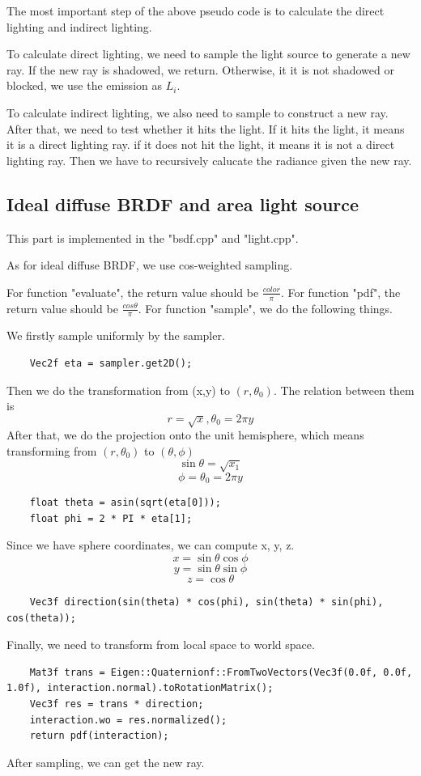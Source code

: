 \documentclass[acmtog]{acmart}
\begin{document}
The most important step of the above pseudo code is to calculate the direct lighting and indirect lighting. 


To calculate direct lighting, we need to sample the light source to generate a new ray. If the new ray is shadowed, we return. Otherwise, it it is not shadowed or blocked, we use the emission as $L_i$.

To calculate indirect lighting, we also need to sample to construct a new ray. 
After that, we need to test whether it hits the light.
If it hits the light, it means it is a direct lighting ray.
if it does not hit the light, it means it is not a direct lighting ray. Then we have to recursively calucate the radiance given the new ray.

\subsection{Ideal diffuse BRDF and area light source}
\quad This part is implemented in the "bsdf.cpp" and "light.cpp".

As for ideal diffuse BRDF, we use cos-weighted sampling. 

For function "evaluate", the return value should be $\frac{color}{\pi}$. For function "pdf", the return value should be $\frac{cos\theta}{\pi}$. 
For function "sample", we do the following things. 

We firstly sample uniformly by the sampler.
\begin{lstlisting}
	Vec2f eta = sampler.get2D();
\end{lstlisting}
Then we do the transformation from (x,y) to $(r,\theta_0)$.
The relation between them is $$r = \sqrt{x}, \theta_0 = 2\pi y $$
After that, we do the projection onto the unit hemisphere, which means transforming from $(r, \theta_0)$ to $(\theta, \phi)$
$$\sin\theta = \sqrt{x_1}$$ $$\phi = \theta_0 = 2\pi y $$
\begin{lstlisting}
	float theta = asin(sqrt(eta[0]));
  	float phi = 2 * PI * eta[1];
\end{lstlisting}
Since we have sphere coordinates, we can compute x, y, z.
$$ x = \sin\theta\cos\phi $$$$ y = \sin\theta\sin\phi $$$$ z = \cos\theta$$
\begin{lstlisting}
	Vec3f direction(sin(theta) * cos(phi), sin(theta) * sin(phi), cos(theta));
\end{lstlisting}
Finally, we need to transform from local space to world space.
\begin{lstlisting}
	Mat3f trans = Eigen::Quaternionf::FromTwoVectors(Vec3f(0.0f, 0.0f, 1.0f), interaction.normal).toRotationMatrix();
	Vec3f res = trans * direction;
	interaction.wo = res.normalized();
	return pdf(interaction);
\end{lstlisting}
After sampling, we can get the new ray.
\end{document}
